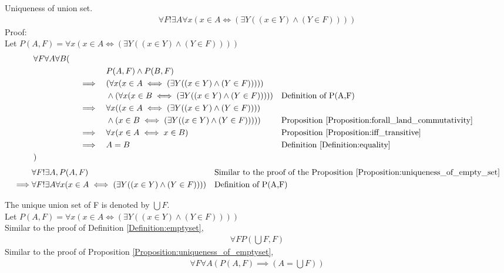 \begin{prop}
\label{Proposition:uniqueness_of_union_set}
Uniqueness of union set.
\begin{align*}
\forall F !\exists A \forall x (x \in A \iff (\exists Y ((x \in Y) \land (Y \in F))))
\end{align*}
Proof: \\
Let $P(A,F) =  \forall x (x \in A \iff (\exists Y ((x \in Y) \land (Y \in F))))$
\begin{align*}
& \forall F \forall A \forall B ( \\
& \quad && &&  P(A,F) \land P(B,F) \\
& \quad && \implies &&  ( \forall x (x \in A \iff (\exists Y ((x \in Y) \land (Y \in F)))) ) \\
& \quad && && \land      ( \forall x (x \in B \iff (\exists Y ((x \in Y) \land (Y \in F)))) )
&& \text{Definition of P(A,F)} \\
& \quad && \implies &&  \forall x ( (x \in A \iff (\exists Y ((x \in Y) \land (Y \in F)))) \\
& \quad && && \land                    (x \in B \iff (\exists Y ((x \in Y) \land (Y \in F)))) )
&& \text{Proposition \ref{Proposition:forall_land_commutativity}} \\
& \quad && \implies && \forall x (x \in A \iff x \in B)
&& \text{Proposition \ref{Proposition:iff_transitive}} \\
& \quad && \implies && A = B
&& \text{Definition \ref{Definition:equality}} \\
& )
\end{align*}
\begin{align*}
& \forall F !\exists A, P(A,F)
&& \text{Similar to the proof of the Proposition \ref{Proposition:uniqueness_of_empty_set}} \\
\implies & \forall F !\exists A \forall x (x \in A \iff (\exists Y ((x \in Y) \land (Y \in F)))) && \text{Definition of P(A,F)} \\
\end{align*}
\end{prop}

\begin{defn}
\label{Definition:union_set}
The unique union set of F is denoted by $\bigcup F$. \\
Let $P(A,F) =  \forall x (x \in A \iff (\exists Y ((x \in Y) \land (Y \in F))))$ \\
Similar to the proof of Definition \ref{Definition:emptyset},
\begin{align*}
\forall F P(\bigcup F, F)
\end{align*}
Similar to the proof of Proposition \ref{Proposition:uniqueness_of_emptyset},
\begin{align*}
\forall F \forall A (P(A,F) \implies (A= \bigcup F ))
\end{align*}
\end{defn}

